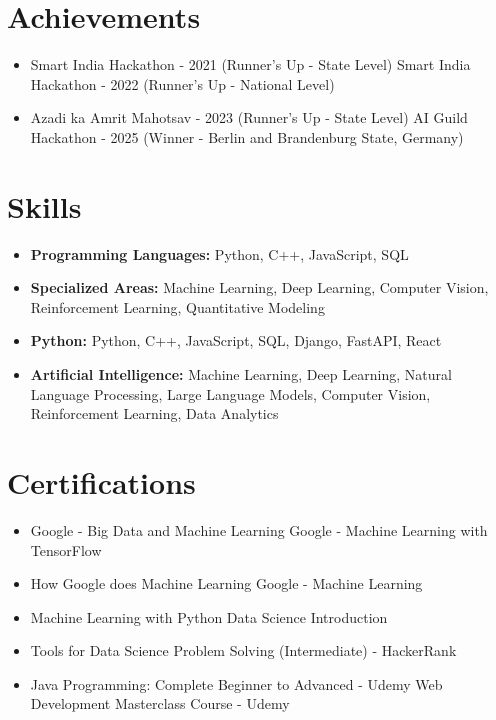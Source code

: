 \documentclass[a4paper,10pt]{article}
\begin{document}
\section*{Achievements}
\begin{itemize}
\item Smart India Hackathon - 2021 (Runner's Up - State Level) \hfill Smart India Hackathon - 2022 (Runner's Up - National Level)
\item Azadi ka Amrit Mahotsav - 2023 (Runner's Up - State Level) \hfill AI Guild Hackathon - 2025 (Winner - Berlin and Brandenburg State, Germany)
\end{itemize}

\section*{Skills}
\begin{itemize}
  \item \textbf{Programming Languages:} Python, C++, JavaScript, SQL
  \item \textbf{Specialized Areas:} Machine Learning, Deep Learning, Computer Vision, Reinforcement Learning, Quantitative Modeling
  \item \textbf{Python:} Python, C++, JavaScript, SQL, Django, FastAPI, React
  \item \textbf{Artificial Intelligence:} Machine Learning, Deep Learning, Natural Language Processing, Large Language Models, Computer Vision, Reinforcement Learning, Data Analytics
\end{itemize}

\section*{Certifications}
\begin{itemize}
\item Google - Big Data and Machine Learning \hfill Google - Machine Learning with TensorFlow
\item How Google does Machine Learning \hfill Google - Machine Learning
\item Machine Learning with Python \hfill Data Science Introduction
\item Tools for Data Science \hfill Problem Solving (Intermediate) - HackerRank
\item Java Programming: Complete Beginner to Advanced - Udemy \hfill Web Development Masterclass Course - Udemy
\end{itemize}
\end{document}
